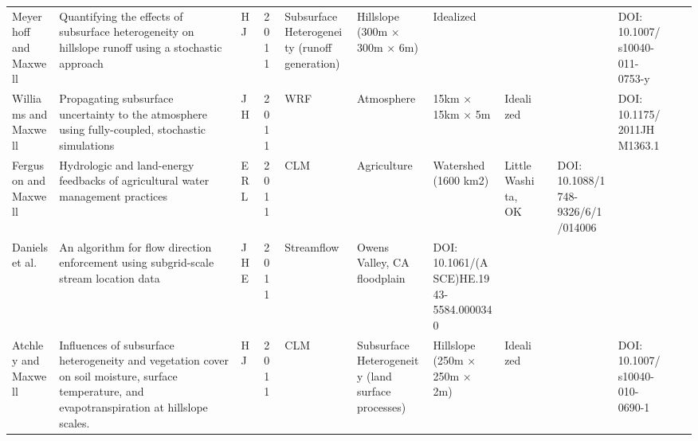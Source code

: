 {{\begin{tabular}{ p{1cm} p{2cm} p{0.75cm} p{0.5cm} p{1cm} p{1.5cm} p{1cm} p{1cm} p{0.25cm} p{0.25cm} p{0.25cm} p{0.25cm} p{1cm} }
Meyerhoff and Maxwell & Quantifying the effects of subsurface heterogeneity on hillslope runoff using a stochastic approach & HJ & 2011 & Subsurface Heterogeneity (runoff generation) & Hillslope (300m × 300m × 6m) & Idealized &  &  &  & DOI: 10.1007/s10040-011-0753-y  \\
Williams and Maxwell & Propagating subsurface uncertainty to the atmosphere using fully-coupled, stochastic simulations & JH & 2011 & WRF & Atmosphere & 15km × 15km × 5m & Idealized &  &  & DOI: 10.1175/2011JHM1363.1 \\
Ferguson and Maxwell & Hydrologic and land-energy feedbacks of agricultural water management practices & ERL & 2011 & CLM & Agriculture & Watershed (1600 km2) & Little Washita, OK &  & DOI: 10.1088/1748-9326/6/1/014006 \\
Daniels et al. & An algorithm for flow direction enforcement using subgrid-scale stream location data & JHE & 2011 & Streamflow & Owens Valley, CA floodplain & DOI: 10.1061/(ASCE)HE.1943-5584.0000340 \\
Atchley and Maxwell & Influences of subsurface heterogeneity and vegetation cover on soil moisture, surface temperature, and evapotranspiration at hillslope scales. & HJ & 2011 & CLM & Subsurface Heterogeneity (land surface processes) & Hillslope (250m × 250m × 2m) & Idealized &  &  & DOI: 10.1007/s10040-010-0690-1  \\
\end{tabular}

}}
